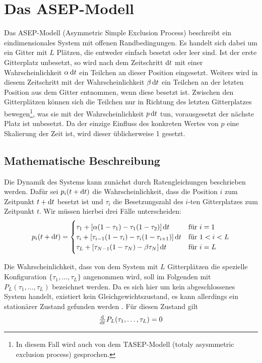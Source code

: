 \documentclass[10pt,a4paper]{report}
\begin{document}
\chapter{Das ASEP-Modell}
Das ASEP-Modell (Asymmetric Simple Exclusion Process) beschreibt ein eindimensionales System mit offenen Randbedingungen. Es handelt sich dabei um ein Gitter mit $L$ Plätzen, die entweder einfach besetzt oder leer sind. Ist der erste Gitterplatz unbesetzt, so wird nach dem Zeitschritt $\dif t$ mit einer Wahrscheinlichkeit $\alpha \dif t$ ein Teilchen an dieser Position eingesetzt. Weiters wird in diesem Zeitschritt mit der Wahrscheinlichkeit $\beta \dif t$ ein Teilchen an der letzten Position aus dem Gitter entnommen, wenn diese besetzt ist. Zwischen den Gitterplätzen können sich die Teilchen nur in Richtung des letzten Gitterplatzes bewegen\footnote{In diesem Fall wird auch von dem TASEP-Modell (totaly asysmmetric exclusion process) gesprochen.}, was sie mit der Wahrscheinlichkeit $p\dif t$ tun, vorausgesetzt der nächste Platz ist unbesetzt. Da der einzige Einfluss des konkreten Wertes von $p$ eine Skalierung der Zeit ist, wird  dieser üblicherweise 1 gesetzt.\\

\section{Mathematische Beschreibung}
Die Dynamik des Systems kann zunächst durch Ratengleichungen beschrieben werden. Dafür sei $p_i(t+\dif t)$ die Wahrscheinlichkeit, dass die Position $i$ zum Zeitpunkt $t+\dif t$ besetzt ist und $\tau_i$ die Besetzungszahl des $i$-ten Gitterplatzes zum Zeitpunkt $t$. Wir müssen hierbei drei Fälle unterscheiden:
\begin{equation}\label{rate_equ}
p_i(t+\dif t)=
\begin{cases}
\tau_1+[\alpha(1-\tau_1)-\tau_1(1-\tau_2)]\dif t & \text{für}\ i=1\\
\tau_i+[\tau_{i-1}(1-\tau_i)-\tau_i(1-\tau_{i+1})]\dif t & \text{für}\ 1<i<L\\
\tau_L+[\tau_{N-1}(1-\tau_N)-\beta\tau_N]\dif t & \text{für}\ i=L
\end{cases}
\end{equation}

Die Wahrscheinlichkeit, dass von dem System mit $L$ Gitterplätzen die spezielle Konfiguration $\{ \tau_1,\ldots,\tau_L \}$ angenommen wird, soll im Folgenden mit $P_L(\tau_1,\ldots,\tau_L)$ bezeichnet werden. Da es sich hier um kein abgeschlossenes System handelt, existiert kein Gleichgewichtszustand, es kann allerdings ein stationärer Zustand gefunden werden \cite{ASEP}. Für diesen Zustand gilt
\begin{equation}
\od{}{t}P_L(\tau_1,\ldots,\tau_L)=0
\end{equation}
\end{document}
